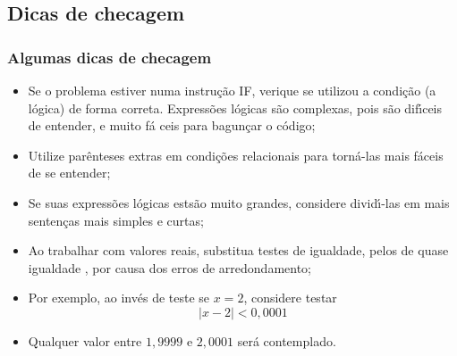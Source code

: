 \documentclass[xcolor=table]{beamer}
\newenvironment{stepitemize}{\begin{itemize}[<+->]}{\end{itemize} }
\begin{document}
\subsection{Dicas de checagem}
\begin{frame}
\frametitle{Algumas dicas de checagem}
\begin{stepitemize}
		\item Se o problema estiver numa instru\c{c}\~{a}o IF, verique se utilizou a
		condi\c{c}\~{a}o (a l\'{o}gica) de forma correta. Express\~{o}es l\'{o}gicas
		s\~{a}o complexas, pois s\~{a}o dif\'{\i}ceis de entender, e muito f\'{a}%
		ceis para bagun\c{c}ar o c\'{o}digo;
		
		\item Utilize par\^{e}nteses extras em condi\c{c}\~{o}es relacionais para
		torn\'{a}-las mais f\'{a}ceis de se entender;
		
		\item Se suas express\~{o}es l\'{o}gicas ests\~{a}o muito grandes, considere
		divid\'{\i}-las em mais senten\c{c}as mais simples e curtas;
		
		\item Ao trabalhar com valores reais, substitua testes de igualdade, pelos
		de quase igualdade , por causa dos erros de arredondamento;
		
		\item Por exemplo, ao inv\'{e}s de teste se $x=2$, considere testar%
		\[
		\left\vert x-2\right\vert <0,0001
		\]
		
		\item Qualquer valor entre $1,9999$ e $2,0001$ ser\'{a} contemplado.
\end{stepitemize}


\transboxout%
\end{frame}%
\end{document}
